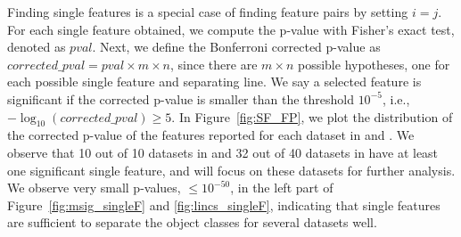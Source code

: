 

 Finding \topk single features is a special case of finding feature pairs by setting $i=j$. For each single feature obtained, we compute the p-value with Fisher's exact test, denoted as $pval$. Next, we define the Bonferroni corrected p-value as $corrected\_pval= pval\times m \times n$, since there are $m \times n$ possible hypotheses, one for each possible single feature and separating line. We say a selected feature is significant if the corrected p-value is smaller than the threshold $10^{-5}$, i.e., $-\log_{10} (corrected\_pval)\geq5$. In Figure~\ref{fig:SF_FP}, we plot the distribution of the corrected p-value of the \tophundred features reported for each dataset in \msig and \lincs. We observe that 10 out of 10 datasets in \msig and 32 out of 40 datasets in \lincs have at least one significant single feature, and will focus on these datasets for further analysis. We observe very small p-values, $\leq 10^{-50}$, in the left part of Figure~\ref{fig:msig_singleF} and \ref{fig:lincs_singleF}, indicating that single features are sufficient to separate the object classes for several datasets well.

%


